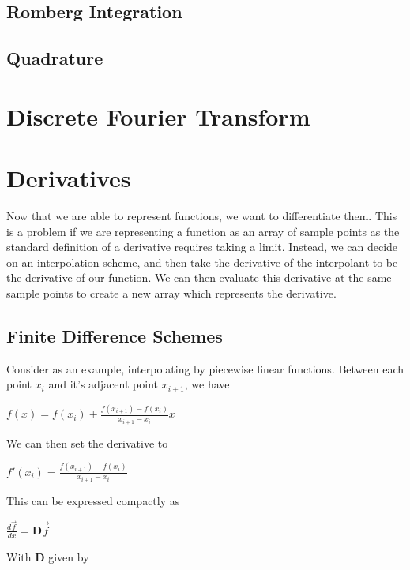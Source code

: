 \documentclass[12pt,letterpaper]{article}
\begin{document}
\subsection{Romberg Integration}

\subsection{Quadrature}

\newpage
\section{Discrete Fourier Transform}

\newpage
\section{Derivatives}
Now that we are able to represent functions, we want to differentiate them. This is a problem if we are representing a function as an array of sample points as the standard definition of a derivative requires taking a limit. Instead, we can decide on an interpolation scheme, and then take the derivative of the interpolant to be the derivative of our function. We can then evaluate this derivative at the same sample points to create a new array which represents the derivative.

\subsection{Finite Difference Schemes}
Consider as an example, interpolating by piecewise linear functions. Between each point $x_i$ and it's adjacent point $x_{i+1}$, we have

\begin{center}
$f(x) = f(x_i) + \frac{f(x_{i+1}) - f(x_i)}{x_{i+1} - x_i}x$
\end{center}

We can then set the derivative to

\begin{center}
$f'(x_i) = \frac{f(x_{i+1}) - f(x_i)}{x_{i+1} - x_i}$
\end{center}

This can be expressed compactly as

\begin{center}
$\frac{d\overrightarrow{f}}{dx} = \boldsymbol{D} \overrightarrow{f}$
\end{center}

With $\boldsymbol{D}$ given by
\end{document}
